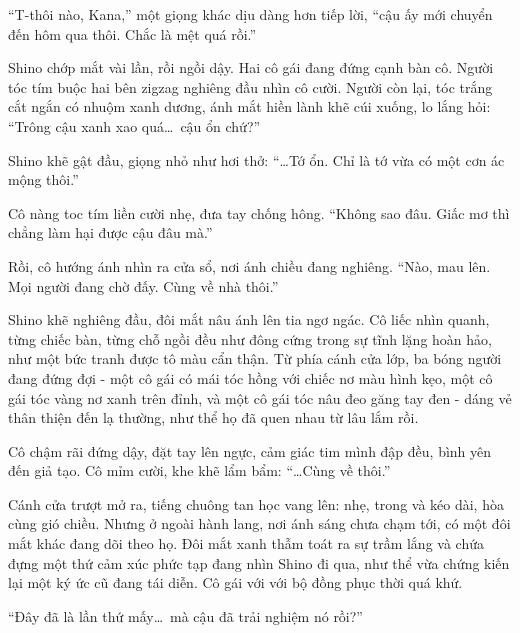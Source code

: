 \documentclass[../main.tex]{subfiles}
\begin{document}
``T-thôi nào, Kana,'' một giọng khác dịu dàng hơn tiếp lời, ``cậu ấy mới chuyển đến hôm qua thôi. Chắc là mệt quá rồi.''


Shino chớp mắt vài lần, rồi ngồi dậy. Hai cô gái đang đứng cạnh bàn cô. Người tóc tím buộc hai bên zigzag nghiêng đầu nhìn cô cười. Người còn lại, tóc trắng cắt ngắn có nhuộm xanh dương, ánh mắt hiền lành khẽ cúi xuống, lo lắng hỏi: ``Trông cậu xanh xao quá\dots\ cậu ổn chứ?''


Shino khẽ gật đầu, giọng nhỏ như hơi thở: ``\dots Tớ ổn. Chỉ là tớ vừa có một cơn ác mộng thôi.''

Cô nàng toc tím liền cười nhẹ, đưa tay chống hông. ``Không sao đâu. Giấc mơ thì chẳng làm hại được cậu đâu mà.''

Rồi, cô hướng ánh nhìn ra cửa sổ, nơi ánh chiều đang nghiêng. ``Nào, mau lên. Mọi người đang chờ đấy. Cùng về nhà thôi.''

Shino khẽ nghiêng đầu, đôi mắt nâu ánh lên tia ngơ ngác. Cô liếc nhìn quanh, từng chiếc bàn, từng chỗ ngồi đều như đông cứng trong sự tĩnh lặng hoàn hảo, như một bức tranh được tô màu cẩn thận. Từ phía cánh cửa lớp, ba bóng người đang đứng đợi - một cô gái có mái tóc hồng với chiếc nơ màu hình kẹo, một cô gái tóc vàng nơ xanh trên đỉnh, và một cô gái tóc nâu đeo găng tay đen - dáng vẻ thân thiện đến lạ thường, như thể họ đã quen nhau từ lâu lắm rồi.


Cô chậm rãi đứng dậy, đặt tay lên ngực, cảm giác tim mình đập đều, bình yên đến giả tạo. Cô mỉm cười, khe khẽ lẩm bẩm: ``\dots Cùng về thôi.''

Cánh cửa trượt mở ra, tiếng chuông tan học vang lên: nhẹ, trong và kéo dài, hòa cùng gió chiều. Nhưng ở ngoài hành lang, nơi ánh sáng chưa chạm tới, có một đôi mắt khác đang dõi theo họ. Đôi mắt xanh thẫm toát ra sự trầm lắng và chứa đựng một thứ cảm xúc phức tạp đang nhìn Shino đi qua, như thể vừa chứng kiến lại một ký ức cũ đang tái diễn. Cô gái với với bộ đồng phục thời quá khứ.

\begin{center}
  ``Đây đã là lần thứ mấy\dots\ mà cậu đã trải nghiệm nó rồi?''
\end{center}
\end{document}
